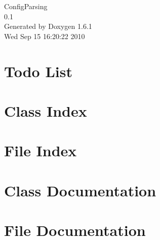\documentclass[a4paper]{book}
\begin{document}
\begin{titlepage}
\vspace*{7cm}
\begin{center}
{\Large ConfigParsing \\[1ex]\large 0.1 }\\
\vspace*{1cm}
{\large Generated by Doxygen 1.6.1}\\
\vspace*{0.5cm}
{\small Wed Sep 15 16:20:22 2010}\\
\end{center}
\end{titlepage}
\clearemptydoublepage
{}
\tableofcontents
\clearemptydoublepage
{}
\chapter{Todo List}
\label{todo}

\chapter{Class Index}

\chapter{File Index}

\chapter{Class Documentation}








\chapter{File Documentation}








\printindex
\end{document}
